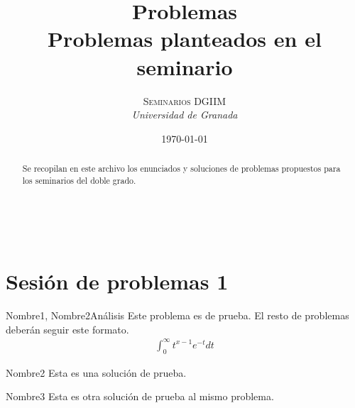 \documentclass[a4paper, 11pt]{article} %
\title{\textbf{Problemas}\\ %
Problemas planteados en el seminario} %
\author{\textsc{Seminarios DGIIM} %
\\{\textit{Universidad de Granada}}} %
\date{\today} %
\makeatletter
\renewcommand{\maketitle}{ %
\begin{flushright} %
    {\LARGE\@title} %
    
    \vspace{50pt} %
    
    {\large\@author} %
    \\\@date %
    
    \vspace{40pt} %
\end{flushright}
}
\numberwithin{prbcounter}{section}
\makeatother
\begin{document}
\maketitle %



\renewcommand{\abstractname}{Resumen} %
\begin{abstract}
  Se recopilan en este archivo los enunciados y soluciones de problemas
  propuestos para los seminarios del doble grado.
\end{abstract}
{\parskip=2pt
  \tableofcontents
}
\pagebreak


\section{Sesión de problemas 1}

  
  \begin{enunciado}{Nombre1, Nombre2}{Análisis}
    Este problema es de prueba. El resto de problemas deberán seguir este formato.
    \begin{gather*}
      \int^\infty_0 t^{x-1} e^{-t} dt
    \end{gather*}
  \end{enunciado}

  \begin{solucion}{Nombre2}
    Esta es una solución de prueba. 
  \end{solucion}

  \begin{solucion}{Nombre3}
    Esta es otra solución de prueba al mismo problema. 
  \end{solucion}
  
\end{document}
